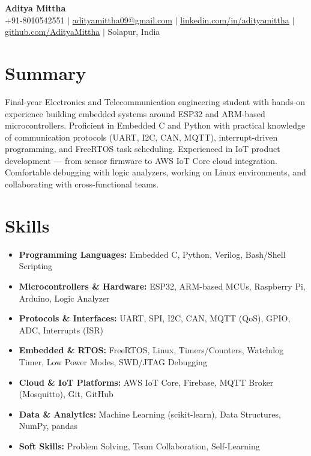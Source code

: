 \documentclass[letterpaper,10pt]{article}
\begin{document}
\begin{center}
  {\LARGE \textbf{Aditya Mittha}} \\[3pt]
  \small
  +91-8010542551 \enspace $|$ \enspace
  \href{mailto:adityamittha09@gmail.com}{adityamittha09@gmail.com} \enspace $|$ \enspace
  \href{https://www.linkedin.com/in/adityamittha}{linkedin.com/in/adityamittha} \enspace $|$ \enspace
  \href{https://github.com/AdityaMittha}{github.com/AdityaMittha} \enspace $|$ \enspace
  Solapur, India
\end{center}

\vspace{-14pt}

\section{Summary}
\small
Final-year Electronics and Telecommunication engineering student with hands-on experience building embedded systems around ESP32 and ARM-based microcontrollers. Proficient in Embedded C and Python with practical knowledge of communication protocols (UART, I2C, CAN, MQTT), interrupt-driven programming, and FreeRTOS task scheduling. Experienced in IoT product development --- from sensor firmware to AWS IoT Core cloud integration. Comfortable debugging with logic analyzers, working on Linux environments, and collaborating with cross-functional teams.

\vspace{-4pt}

\section{Skills}
\small
\begin{itemize}[leftmargin=0.18in, label={}, topsep=0pt, parsep=1pt, itemsep=1pt]
  \item \textbf{Programming Languages:} Embedded C, Python, Verilog, Bash/Shell Scripting
  \item \textbf{Microcontrollers \& Hardware:} ESP32, ARM-based MCUs, Raspberry Pi, Arduino, Logic Analyzer
  \item \textbf{Protocols \& Interfaces:} UART, SPI, I2C, CAN, MQTT (QoS), GPIO, ADC, Interrupts (ISR)
  \item \textbf{Embedded \& RTOS:} FreeRTOS, Linux, Timers/Counters, Watchdog Timer, Low Power Modes, SWD/JTAG Debugging
  \item \textbf{Cloud \& IoT Platforms:} AWS IoT Core, Firebase, MQTT Broker (Mosquitto), Git, GitHub
  \item \textbf{Data \& Analytics:} Machine Learning (scikit-learn), Data Structures, NumPy, pandas
  \item \textbf{Soft Skills:} Problem Solving, Team Collaboration, Self-Learning
\end{itemize}
\end{document}
